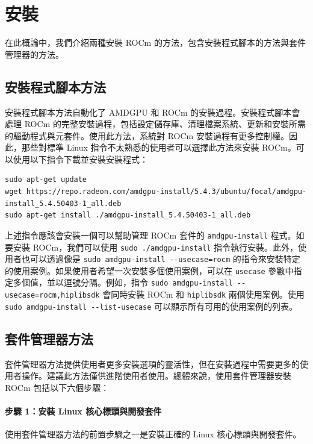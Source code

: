 \section{安裝}

在此概論中，我們介紹兩種安裝 ROCm 的方法，包含安裝程式腳本的方法與套件管理器的方法。

\subsection{安裝程式腳本方法}
\label{sec:rocm_installer_method}
安裝程式腳本方法自動化了 AMDGPU 和 ROCm 的安裝過程。安裝程式腳本會處理 ROCm 的完整安裝過程，包括設定儲存庫、清理檔案系統、更新和安裝所需的驅動程式與元套件。使用此方法，系統對 ROCm 安裝過程有更多控制權。因此，那些對標準 Linux 指令不太熟悉的使用者可以選擇此方法來安裝 ROCm。可以使用以下指令下載並安裝安裝程式：

\begin{lstlisting}[caption={使用安裝程式腳本安裝 ROCm 所需指令}, label={lst:a1}]
sudo apt-get update
wget https://repo.radeon.com/amdgpu-install/5.4.3/ubuntu/focal/amdgpu-install_5.4.50403-1_all.deb
sudo apt-get install ./amdgpu-install_5.4.50403-1_all.deb
\end{lstlisting}

上述指令應該會安裝一個可以幫助管理 ROCm 套件的 \lstinline|amdgpu-install| 程式。如要安裝 ROCm，我們可以使用 \lstinline|sudo ./amdgpu-install| 指令執行安裝。此外，使用者也可以透過像是 \lstinline|sudo amdgpu-install --usecase=rocm| 的指令來安裝特定的使用案例。如果使用者希望一次安裝多個使用案例，可以在 \lstinline|usecase| 參數中指定多個值，並以逗號分隔。例如，指令 \lstinline|sudo amdgpu-install --usecase=rocm,hiplibsdk| 會同時安裝 ROCm 和 \lstinline|hiplibsdk| 兩個使用案例。使用 \lstinline|sudo amdgpu-install --list-usecase| 可以顯示所有可用的使用案例的列表。


\subsection{套件管理器方法}

套件管理器方法提供使用者更多安裝選項的靈活性，但在安裝過程中需要更多的使用者操作。建議此方法僅供進階使用者使用。總體來說，使用套件管理器安裝 ROCm 包括以下六個步驟：

\paragraph{步驟 1：安裝 Linux 核心標頭與開發套件}
使用套件管理器方法的前置步驟之一是安裝正確的 Linux 核心標頭與開發套件。

